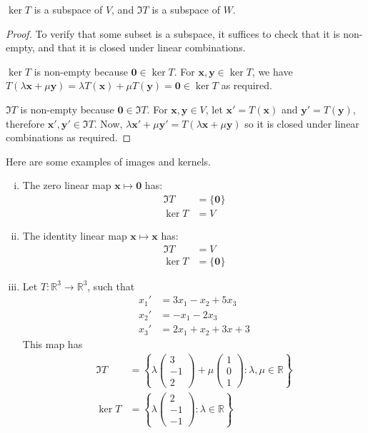 \documentclass{article}
\begin{document}
	\begin{lemma}
		$\ker T$ is a subspace of $V$, and $\Im T$ is a subspace of $W$.
	\end{lemma}
	\begin{proof}
		To verify that some subset is a subspace, it suffices to check that it is non-empty, and that it is closed under linear combinations.

		$\ker T$ is non-empty because $\bm 0 \in \ker T$. For $\bm x, \bm y \in \ker T$, we have $T(\lambda \bm x + \mu \bm y) = \lambda T(\bm x) + \mu T(\bm y) = \bm 0 \in \ker T$ as required.

		$\Im T$ is non-empty because $\bm 0 \in \Im T$. For $\bm x, \bm y \in V$, let $\bm x' = T(\bm x)$ and $\bm y' = T(\bm y)$, therefore $\bm x', \bm y' \in \Im T$. Now, $\lambda \bm x' + \mu \bm y' = T(\lambda \bm x + \mu \bm y)$ so it is closed under linear combinations as required.
	\end{proof}
	Here are some examples of images and kernels.
	\begin{enumerate}[(i)]
		\item The zero linear map $\bm x \mapsto \bm 0$ has:
		\begin{align*}
			\Im T &= \{ \bm 0 \} \\
			\ker T &= V
		\end{align*}
		\item The identity linear map $\bm x \mapsto \bm x$ has:
		\begin{align*}
			\Im T &= V \\
			\ker T &= \{ \bm 0 \}
		\end{align*}
		\item Let $T: \mathbb R^3 \to \mathbb R^3$, such that
		\begin{align*}
			x_1' &= 3x_1 - x_2 + 5x_3 \\
			x_2' &= -x_1 - 2x_3 \\
			x_3' &= 2x_1 + x_2 + 3x+3
		\end{align*}
		This map has
		\begin{align*}
			\Im T &= \left\{ \lambda \begin{pmatrix} 3 \\ -1 \\ 2 \end{pmatrix} + \mu \begin{pmatrix} 1 \\ 0 \\ 1 \end{pmatrix} : \lambda, \mu \in \mathbb R \right\} \\
			\ker T &= \left\{ \lambda \begin{pmatrix} 2 \\ -1 \\ -1 \end{pmatrix} : \lambda \in \mathbb R \right\}
		\end{align*}
	\end{enumerate}
\end{document}
